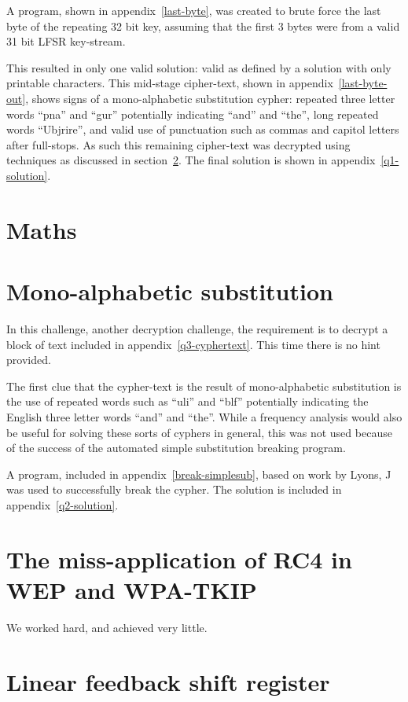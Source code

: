 \documentclass[pdftex, 12pt, a4paper]{article}
\begin{document}
A program, shown in appendix~\ref{last-byte}, was created to brute force the last byte of the repeating 32 bit key, assuming that the first 3 bytes were from a valid 31 bit LFSR key-stream.

This resulted in only one valid solution: valid as defined by a solution with only printable characters.  This mid-stage cipher-text, shown in appendix~\ref{last-byte-out}, shows signs of a mono-alphabetic substitution cypher: repeated three letter words ``pna'' and ``gur'' potentially indicating ``and'' and ``the'', long repeated words ``Ubjrire'', and valid use of punctuation such as commas and capitol letters after full-stops. As such this remaining cipher-text was decrypted using techniques as discussed in section~\ref{mono}.  The final solution is shown in appendix~\ref{q1-solution}.

\section{Maths}

\section{Mono-alphabetic substitution}\label{mono}
In this challenge, another decryption challenge, the requirement is to decrypt a block of text included in appendix~\ref{q3-cyphertext}. This time there is no hint provided.

The first clue that the cypher-text is the result of mono-alphabetic substitution is the use of repeated words such as ``uli'' and ``blf'' potentially indicating the English three letter words ``and'' and ``the''. While a frequency analysis would also be useful for solving these sorts of cyphers in general, this was not used because of the success of the automated simple substitution breaking program.

A program, included in appendix~\ref{break-simplesub}, based on work by Lyons, J\cite{stochastic-searching} was used to successfully break the cypher. The solution is included in appendix~\ref{q2-solution}.

\section{The miss-application of RC4 in WEP and WPA-TKIP}\label{conclusions}
We worked hard, and achieved very little.

\printbibliography

\appendices
\section{Linear feedback shift register}
\end{document}
